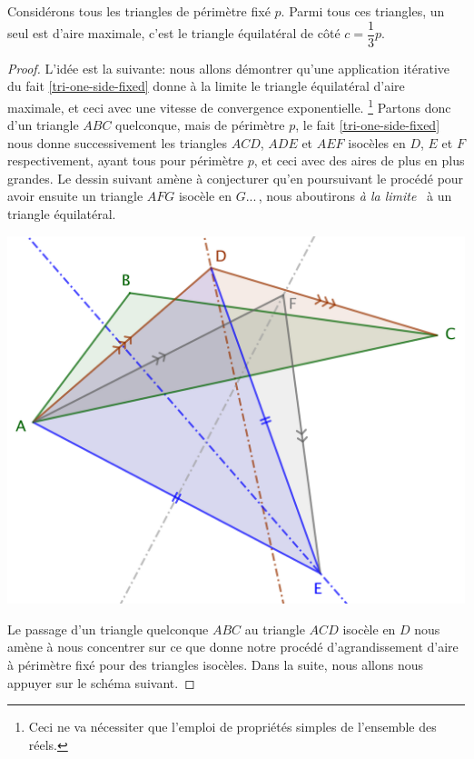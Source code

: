 \begin{fact} \label{iso-tri}
	Considérons tous les triangles de périmètre fixé $p$. Parmi tous ces triangles, un seul est d'aire maximale, c'est le triangle équilatéral de côté $c = \dfrac13 p$.
\end{fact}


\begin{proof}	
	L'idée est la suivante: nous allons démontrer qu'une application itérative du fait \ref{tri-one-side-fixed} donne à la limite le triangle équilatéral d'aire maximale, et ceci avec une vitesse de convergence exponentielle.%
	\footnote{
		Ceci ne va nécessiter que l'emploi de propriétés simples de l'ensemble des réels.
	}
	Partons donc d'un triangle $ABC$ quelconque, mais de périmètre $p$, le fait \ref{tri-one-side-fixed} nous donne successivement les triangles $ACD$, $ADE$ et $AEF$ isocèles en $D$, $E$ et $F$ respectivement, ayant tous pour périmètre $p$, et ceci avec des aires de plus en plus grandes.  
	Le dessin suivant amène à conjecturer qu'en poursuivant le procédé pour avoir ensuite un triangle $AFG$ isocèle en $G$...\,, nous aboutirons \og \emph{à la limite} \fg\ à un triangle équilatéral.

	\begin{center}
		\includegraphics[scale=.4]{content/triangle-gene/triangle-conj.png}
	\end{center} 

	
	Le passage d'un triangle quelconque $ABC$ au triangle $ACD$ isocèle en $D$ nous amène à nous concentrer sur ce que donne notre procédé d'agrandissement d'aire à périmètre fixé pour des triangles isocèles. 
	Dans la suite, nous allons nous appuyer sur le schéma suivant.
	

\end{proof}
